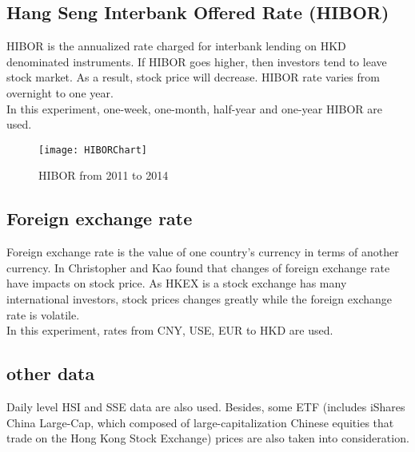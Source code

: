 \subsection{Hang Seng Interbank Offered Rate (HIBOR)}
HIBOR is the annualized rate charged for interbank lending on HKD denominated instruments\cite{chen2010principal}. If HIBOR goes higher, then investors tend to leave stock market. As a result, stock price will decrease. HIBOR rate varies from overnight to one year. \\



In this experiment, one-week, one-month, half-year and one-year HIBOR are used. 

\begin{figure}[h]
	\centering
	\texttt{[image: HIBORChart]}
	\caption{HIBOR from 2011 to 2014}
\end{figure}



\subsection{Foreign exchange rate}
Foreign exchange rate is the value of one country’s currency in terms of another currency. In \cite{ma1990exchange} Christopher and Kao found that changes of foreign exchange rate have impacts on stock price. As HKEX is a stock exchange has many international investors, stock prices changes greatly while the foreign exchange rate is volatile.\\


In this experiment, rates from CNY, USE, EUR to HKD are used.

\subsection{other data}
Daily level HSI and SSE data are also used. Besides, some ETF (includes iShares China Large-Cap, which composed of large-capitalization Chinese equities that trade on the Hong Kong Stock Exchange) prices are also taken into consideration.
